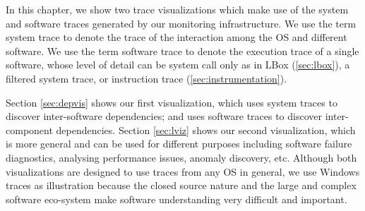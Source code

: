 

In this chapter, we show two trace visualizations which make use
of the system and software traces generated by our monitoring infrastructure.
We use the term system trace to denote the trace of the interaction
among the OS and different software.
We use the term software trace to denote the execution trace of a single
software, whose level of detail can be system call only as in LBox
(\autoref{sec:lbox}), a filtered system trace, or
instruction trace (\autoref{sec:instrumentation}).

Section \ref{sec:depvis} shows our first visualization, which
uses system traces to discover inter-software
dependencies; and uses software traces to
discover inter-component dependencies.
Section \ref{sec:lviz} shows our second visualization, which
is more general and can be used for different
purposes including software failure diagnostics, analysing performance
issues, anomaly discovery, etc.
Although both visualizations are designed to use traces from any OS in general,
we use Windows traces as illustration because
the closed source nature and the large and complex software eco-system make
software understanding very difficult and important.
